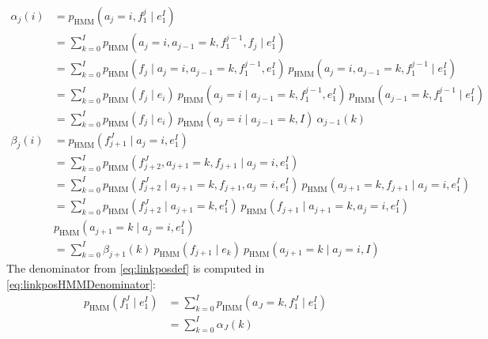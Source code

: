 \begin{align}
  \alpha_{j}(i) &= p_{\text{HMM}}(a_{j} = i, f_1^{j} \mid e_1^I) \nonumber \\
                &= \sum_{k = 0}^I p_{\text{HMM}}(a_{j} = i, a_{j - 1} = k, f_1^{j - 1}, f_j \mid e_1^I) \nonumber \\
                &= \sum_{k = 0}^I p_{\text{HMM}}(f_j \mid a_j = i, a_{j - 1} = k, f_1^{j-1}, e_1^I) \ p_{\text{HMM}}(a_{j} = i, a_{j - 1} = k, f_1^{j - 1} \mid e_1^I) \nonumber \\
                &= \sum_{k = 0}^I p_{\text{HMM}}(f_j \mid e_i) \ p_{\text{HMM}}(a_{j} = i \mid a_{j - 1} = k, f_1^{j - 1}, e_1^I) \ p_{\text{HMM}}(a_{j - 1} = k, f_1^{j - 1} \mid e_1^I) \nonumber \\
                &= \sum_{k = 0}^I p_{\text{HMM}}(f_j \mid e_i) \ p_{\text{HMM}}(a_{j} = i \mid a_{j - 1} = k, I) \ \alpha_{j - 1}(k) \label{eq:forwardRecursion} \\
  \beta_{j}(i)  &= p_{\text{HMM}}(f_{j + 1}^J \mid a_{j} = i, e_1^I) \nonumber \\
                &= \sum_{k = 0}^I p_{\text{HMM}}(f_{j+2}^J, a_{j + 1} = k, f_{j + 1} \mid a_j = i, e_1^I) \nonumber \\
                &= \sum_{k = 0}^I p_{\text{HMM}}(f_{j+2}^J \mid a_{j + 1} = k, f_{j + 1}, a_j = i, e_1^I) \ p_{\text{HMM}}(a_{j + 1} = k, f_{j + 1} \mid a_j = i, e_1^I) \nonumber \\
                &= \sum_{k = 0}^I p_{\text{HMM}}(f_{j+2}^J \mid a_{j + 1} = k, e_1^I) \ p_{\text{HMM}}(f_{j + 1} \mid a_{j + 1} = k, a_j = i, e_1^I) \nonumber \\
                & p_{\text{HMM}}(a_{j + 1} = k \mid a_j = i, e_1^I) \nonumber \\
                &= \sum_{k = 0}^I \beta_{j + 1}(k) \ p_{\text{HMM}}(f_{j + 1} \mid e_k) \ p_{\text{HMM}}(a_{j + 1} = k \mid a_j = i, I) \label{eq:backwardRecursion}
\end{align}
%
The denominator from \autoref{eq:linkposdef} is computed in
\autoref{eq:linkposHMMDenominator}:
%
\begin{align}
  p_{\text{HMM}}(f_1^J \mid e_1^I) &= \sum_{k = 0}^I p_{\text{HMM}}(a_J = k, f_1^J \mid e_1^I) \nonumber \\
                                &= \sum_{k = 0}^I \alpha_J(k) \label{eq:linkposHMMDenominator}
\end{align}
%
%
%

